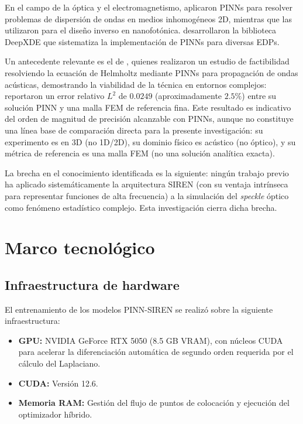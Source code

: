 En el campo de la óptica y el electromagnetismo, \textcite{fang2020physics}
aplicaron PINNs para resolver problemas de dispersión de ondas en medios
inhomogéneos 2D, mientras que \textcite{chen2020physics} las utilizaron para
el diseño inverso en nanofotónica. \textcite{lu2021deepxde} desarrollaron la
biblioteca DeepXDE que sistematiza la implementación de PINNs para diversas EDPs.

Un antecedente relevante es el de \textcite{schoder2024helmholtz}, quienes
realizaron un estudio de factibilidad resolviendo la ecuación de Helmholtz
mediante PINNs para propagación de ondas acústicas, demostrando la viabilidad
de la técnica en entornos complejos: reportaron un error relativo $L^2$ de
$0.0249$ (aproximadamente $2.5\%$) entre su solución PINN y una malla FEM de
referencia fina. Este resultado es indicativo del orden de magnitud de
precisión alcanzable con PINNs, aunque no constituye una línea base de
comparación directa para la presente investigación: su experimento es en 3D
(no 1D/2D), su dominio físico es acústico (no óptico), y su métrica de
referencia es una malla FEM (no una solución analítica exacta).

La brecha en el conocimiento identificada es la siguiente: ningún trabajo
previo ha aplicado sistemáticamente la arquitectura SIREN \parencite{sitzmann2020siren}
(con su ventaja intrínseca para representar funciones de alta frecuencia)
a la simulación del \textit{speckle} óptico como fenómeno estadístico complejo.
Esta investigación cierra dicha brecha.

\section{Marco tecnológico}

\subsection{Infraestructura de hardware}

El entrenamiento de los modelos PINN-SIREN se realizó sobre la siguiente
infraestructura:

\begin{itemize}
    \item \textbf{GPU:} NVIDIA GeForce RTX 5050 (8.5 GB VRAM), con núcleos
    CUDA para acelerar la diferenciación automática de segundo orden requerida
    por el cálculo del Laplaciano.
    \item \textbf{CUDA:} Versión 12.6.
    \item \textbf{Memoria RAM:} Gestión del flujo de puntos de colocación y
    ejecución del optimizador híbrido.
\end{itemize}

